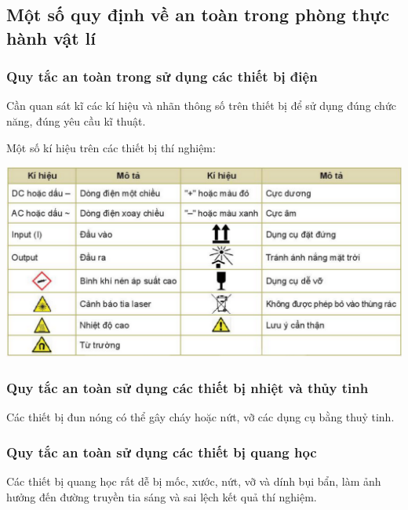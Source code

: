 \subsection{Một số quy định về an toàn trong phòng thực hành vật lí}
\subsubsection{Quy tắc an toàn trong sử dụng các thiết bị điện}
Cần quan sát kĩ các kí hiệu và nhãn thông số trên thiết bị để sử dụng đúng chức năng, đúng yêu cầu kĩ thuật.

Một số kí hiệu trên các thiết bị thí nghiệm:
\begin{center}
	\includegraphics[scale=0.8]{../figs/G10-2-1}
\end{center}
\subsubsection{Quy tắc an toàn sử dụng các thiết bị nhiệt và thủy tinh}
Các thiết bị đun nóng có thể gây cháy hoặc nứt, vỡ các dụng cụ bằng thuỷ tinh.
\subsubsection{Quy tắc an toàn sử dụng các thiết bị quang học}
Các thiết bị quang học rất dễ bị mốc, xước, nứt, vỡ và dính bụi bẩn, làm ảnh hưởng đến đường truyền tia sáng và sai lệch kết quả thí nghiệm.
